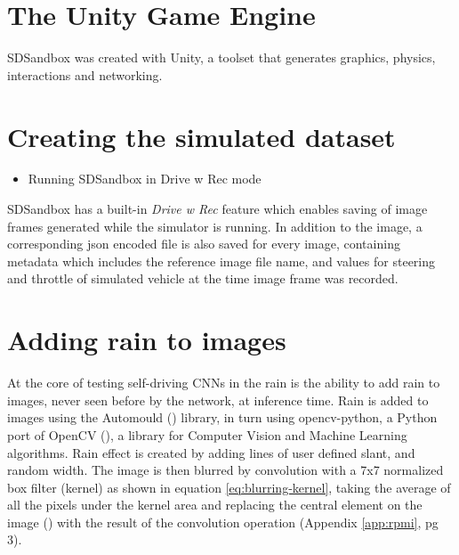 


\section{The Unity Game Engine}

SDSandbox was created with Unity, a toolset that generates graphics, physics, interactions and networking.

\section{Creating the simulated dataset}

\begin{itemize}
    \item Running SDSandbox in Drive w Rec mode
\end{itemize}

SDSandbox has a built-in \textit{Drive w Rec} feature which enables saving of image frames generated while the simulator is running. In addition to the image, a corresponding json encoded file is also saved for every image, containing metadata which includes the reference image file name, and values for steering and throttle of simulated vehicle at the time image frame was recorded. 


\section{Adding rain to images}
\label{methods:AddingRainToImages}
At the core of testing self-driving CNNs in the rain is the ability to add rain to images, never seen before by the network, at inference time.
Rain is added to images using the Automould (\cite{Saxena2017}) library, in turn using opencv-python, a Python port of OpenCV (\cite{mordvintsev2014opencv}), a library for Computer Vision and Machine Learning algorithms. Rain effect is created by adding lines of user defined slant, and random width. The image is then blurred by convolution with a 7x7 normalized box filter (kernel) as shown in equation \ref{eq:blurring-kernel}, taking the average of all the pixels under the kernel area and replacing the central element on the image (\cite{documentationOpenCV2020}) with the result of the convolution operation (Appendix \ref{app:rpmi}, pg 3).


